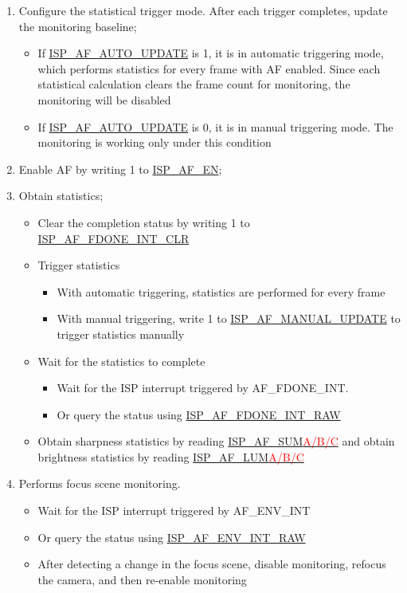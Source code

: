 \documentclass[main\_\_EN.tex]{subfiles}
\begin{document}
\begin{enumerate}
    \item Configure the statistical trigger mode. After each trigger completes, update the monitoring baseline;
    \begin{itemize}
        \item If \hyperref[fielddesc:ISPAFAUTOUPDATE]{ISP\_AF\_AUTO\_UPDATE} is 1, it is in automatic triggering mode, which performs statistics for every frame with AF enabled. Since each statistical calculation clears the frame count for monitoring, the monitoring will be disabled
        \item If \hyperref[fielddesc:ISPAFAUTOUPDATE]{ISP\_AF\_AUTO\_UPDATE} is 0, it is in manual triggering mode. The monitoring is working only under this condition
    \end{itemize}

    \item Enable AF by writing 1 to \hyperref[fielddesc:ISPAFEN]{ISP\_AF\_EN};

    \item Obtain statistics;
    \begin{itemize}
        \item Clear the completion status by writing 1 to \hyperref[fielddesc:ISPAFFDONEINTCLR]{ISP\_AF\_FDONE\_INT\_CLR}
        \item Trigger statistics
        \begin{itemize}
            \item With automatic triggering, statistics are performed for every frame
            \item With manual triggering, write 1 to \hyperref[fielddesc:ISPAFMANUALUPDATE]{ISP\_AF\_MANUAL\_UPDATE} to trigger statistics manually
        \end{itemize}
        \item Wait for the statistics to complete
        \begin{itemize}
            \item Wait for the ISP interrupt triggered by AF\_FDONE\_INT.
            \item Or query the status using \hyperref[fielddesc:ISPAFFDONEINTRAW]{ISP\_AF\_FDONE\_INT\_RAW}
        \end{itemize}
        \item Obtain sharpness statistics by reading \hyperref[fielddesc:ISPAFSUMA]{ISP\_AF\_SUM\textcolor{red}{A/B/C}} and obtain brightness statistics by reading \hyperref[fielddesc:ISPAFLUMA]{ISP\_AF\_LUM\textcolor{red}{A/B/C}}
    \end{itemize}

    \item Performs focus scene monitoring.
    \begin{itemize}
        \item Wait for the ISP interrupt triggered by AF\_ENV\_INT
        \item Or query the status using \hyperref[fielddesc:ISPAFENVINTRAW]{ISP\_AF\_ENV\_INT\_RAW}
        \item After detecting a change in the focus scene, disable monitoring, refocus the camera, and then re-enable monitoring
    \end{itemize}
\end{enumerate}
\end{document}
